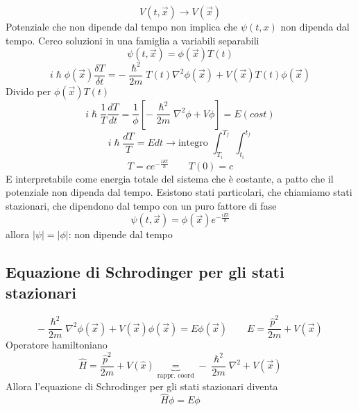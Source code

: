 \begin{equation*}
    V(t,\vec{x}) \rightarrow V(\vec{x})
\end{equation*}
Potenziale che non dipende dal tempo non implica che $\psi(t,x)$ non dipenda dal tempo. Cerco soluzioni in una famiglia a variabili separabili
\begin{equation*}
    \psi(t,\vec{x}) = \phi(\vec{x})T(t)
\end{equation*}
\begin{equation*}
    i\hslash \phi(\vec{x}) \frac{\delta T}{\delta t} = -\frac{\hslash^2}{2m} T(t) \nabla^2\phi(\vec{x}) + V(\vec{x})T(t)\phi(\vec{x})
\end{equation*}
Divido per $\phi(\vec{x})T(t)$
\begin{equation*}
    i\hslash \frac{1}{T} \frac{dT}{dt} = \frac{1}{\phi} \left[-\frac{\hslash^2}{2m}\nabla^2\phi + V\phi \right] = E(cost)
\end{equation*}
\begin{equation*}
    i\hslash \frac{dT}{T} = E dt \rightarrow \mbox{integro } \int_{T_i}^{T_f} \; \int_{t_i}^{t_f}
\end{equation*}
\begin{equation*}
    T = c e^{-\frac{iEt}{\hslash}} \qquad T(0) = c
\end{equation*}
E interpretabile come energia totale del sistema che è costante, a patto che il potenziale non dipenda dal tempo. Esistono stati particolari, che chiamiamo stati stazionari, che dipendono dal tempo con un puro fattore di fase
\begin{equation*}
    \psi(t,\vec{x}) = \phi(\vec{x}) e^{-\frac{iEt}{\hslash}}
\end{equation*}
allora $|\psi| = |\phi|$: non dipende dal tempo 

\subsection*{Equazione di Schrodinger per gli stati stazionari}

\begin{equation}
    -\frac{\hslash^2}{2m} \nabla^2\phi(\vec{x}) + V(\vec{x})\phi(\vec{x}) = E\phi(\vec{x}) \qquad E = \frac{\hat{p}^2}{2m} + V(\vec{x})
\end{equation}
Operatore hamiltoniano
\begin{equation*}
    \hat{H} = \frac{\hat{p}^2}{2m} + V(\hat{x}) \underbrace{=}_{\mbox{rappr. coord}} -\frac{\hslash^2}{2m}\nabla^2 + V(\vec{x})
\end{equation*}
Allora l'equazione di Schrodinger per gli stati stazionari diventa
\begin{equation*}
    \hat{H}\phi = E\phi 
\end{equation*}

